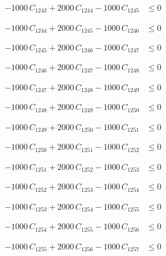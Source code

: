\documentclass[a4paper,11pt]{article}
\begin{document}
\begin{align}
-1000\,C_{1243} + 2000\,C_{1244} - 1000\,C_{1245} &\leq 0 \nonumber
\end{align}

\begin{align}
-1000\,C_{1244} + 2000\,C_{1245} - 1000\,C_{1246} &\leq 0 \nonumber
\end{align}

\begin{align}
-1000\,C_{1245} + 2000\,C_{1246} - 1000\,C_{1247} &\leq 0 \nonumber
\end{align}

\begin{align}
-1000\,C_{1246} + 2000\,C_{1247} - 1000\,C_{1248} &\leq 0 \nonumber
\end{align}

\begin{align}
-1000\,C_{1247} + 2000\,C_{1248} - 1000\,C_{1249} &\leq 0 \nonumber
\end{align}

\begin{align}
-1000\,C_{1248} + 2000\,C_{1249} - 1000\,C_{1250} &\leq 0 \nonumber
\end{align}

\begin{align}
-1000\,C_{1249} + 2000\,C_{1250} - 1000\,C_{1251} &\leq 0 \nonumber
\end{align}

\begin{align}
-1000\,C_{1250} + 2000\,C_{1251} - 1000\,C_{1252} &\leq 0 \nonumber
\end{align}

\begin{align}
-1000\,C_{1251} + 2000\,C_{1252} - 1000\,C_{1253} &\leq 0 \nonumber
\end{align}

\begin{align}
-1000\,C_{1252} + 2000\,C_{1253} - 1000\,C_{1254} &\leq 0 \nonumber
\end{align}

\begin{align}
-1000\,C_{1253} + 2000\,C_{1254} - 1000\,C_{1255} &\leq 0 \nonumber
\end{align}

\begin{align}
-1000\,C_{1254} + 2000\,C_{1255} - 1000\,C_{1256} &\leq 0 \nonumber
\end{align}

\begin{align}
-1000\,C_{1255} + 2000\,C_{1256} - 1000\,C_{1257} &\leq 0 \nonumber
\end{align}
\end{document}
